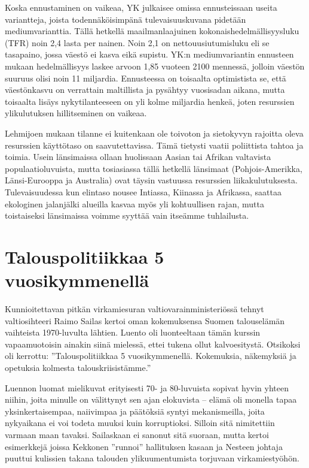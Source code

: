 \documentclass[12pt]{article}
\begin{document}
Koska ennustaminen on vaikeaa, YK julkaisee omissa ennusteissaan useita
variantteja, joista todennäköisimpänä tulevaisuuskuvana pidetään
mediumvarianttia. Tällä hetkellä maailmanlaajuinen kokonaishedelmällisyysluku
(TFR) noin 2,4 lasta per nainen. Noin 2,1 on nettouusiutumisluku eli se
tasapaino, jossa väestö ei kasva eikä supistu. YK:n mediumvariantin ennusteen
mukaan hedelmällisyys laskee arvoon 1,85 vuoteen 2100 mennessä, jolloin väestön
suuruus olisi noin 11 miljardia. Ennusteessa on toisaalta optimistista se, että
väestönkasvu on verrattain maltillista ja pysähtyy vuosisadan aikana, mutta
toisaalta lisäys nykytilanteeseen on yli kolme miljardia henkeä, joten
resurssien ylikulutuksen hillitseminen on vaikeaa.

Lehmijoen mukaan tilanne ei kuitenkaan ole toivoton ja sietokyvyn rajoitta
oleva resurssien käyttötaso on saavutettavissa. Tämä tietysti vaatii
poliittista tahtoa ja toimia. Usein länsimaissa ollaan huolissaan Aasian tai
Afrikan valtavista populaatioluvuista, mutta tosiasiassa tällä hetkellä
länsimaat (Pohjois-Amerikka, Länsi-Eurooppa ja Australia) ovat täysin vastuussa
resurssien liikakulutuksesta. Tulevaisuudessa kun elintaso nousee Intiassa,
Kiinassa ja Afrikassa, saattaa ekologinen jalanjälki alueilla kasvaa myös yli
kohtuullisen rajan, mutta toistaiseksi länsimaissa voimme syyttää vain itseämme
tuhlailusta.


\newpage
\section{Talouspolitiikkaa 5 vuosikymmenellä}

Kunnioitettavan pitkän virkamiesuran valtiovarainministeriössä tehnyt
valtiosihteeri Raimo Sailas kertoi oman kokemuksensa Suomen talouselämän
vaihteista 1970-luvulta lähtien. Luento oli luonteeltaan tämän kurssin
vapaamuotoisin ainakin siinä mielessä, ettei tukena ollut kalvoesitystä.
Otsikoksi oli kerrottu: ''Talouspolitiikkaa 5 vuosikymmenellä. Kokemuksia,
näkemyksiä ja opetuksia kolmesta talouskriisistämme.''

Luennon luomat mielikuvat erityisesti 70- ja 80-luvuista sopivat hyvin yhteen
niihin, joita minulle on välittynyt sen ajan elokuvista -- elämä oli monella
tapaa yksinkertaisempaa, naiivimpaa ja päätöksiä syntyi mekanismeilla, joita
nykyaikana ei voi todeta muuksi kuin korruptioksi. Silloin sitä nimitettiin
varmaan maan tavaksi. Sailaskaan ei sanonut sitä suoraan, mutta kertoi
esimerkkejä joissa Kekkonen ''runnoi'' hallituksen kasaan ja Nesteen johtaja
puuttui kulissien takana talouden ylikuumentumista torjuvaan virkamiestyöhön.
\end{document}
